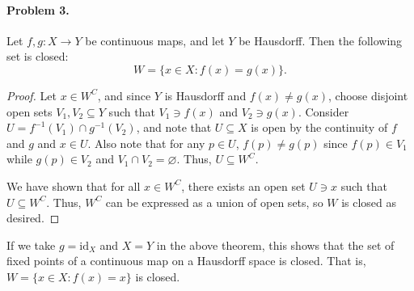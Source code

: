 \documentclass[12pt]{article}
\begin{document}
\paragraph{Problem 3.} Let $f, g : X \to Y$ be continuous maps, and let $Y$ be Hausdorff. Then the following set is closed:
\[W = \{ x \in X : f(x) = g(x) \}. \]

\begin{proof}
    Let $x \in W^C$, and since $Y$ is Hausdorff and $f(x) \neq g(x)$, choose disjoint open sets $V_1, V_2 \subseteq Y$ such that $V_1 \ni f(x)$ and $V_2 \ni g(x)$. Consider $U = f^{-1}(V_1) \cap g^{-1}(V_2)$, and note that $U\subseteq X$ is open by the continuity of $f$ and $g$ and $x \in U$. Also note that for any $p \in U$, $f(p) \neq g(p)$ since $f(p) \in V_1$ while $g(p) \in V_2$ and $V_1 \cap V_2 = \varnothing$. Thus, $U \subseteq W^C$.

    We have shown that for all $x \in W^C$, there exists an open set $U \ni x$ such that $U \subseteq W^C$. Thus, $W^C$ can be expressed as a union of open sets, so $W$ is closed as desired.
\end{proof}



If we take $g = \mathrm{id}_X$ and $X = Y$ in the above theorem, this shows that the set of fixed points of a continuous map on a Hausdorff space is closed. That is, $W = \{x \in X : f(x) = x \}$ is closed.
\end{document}
